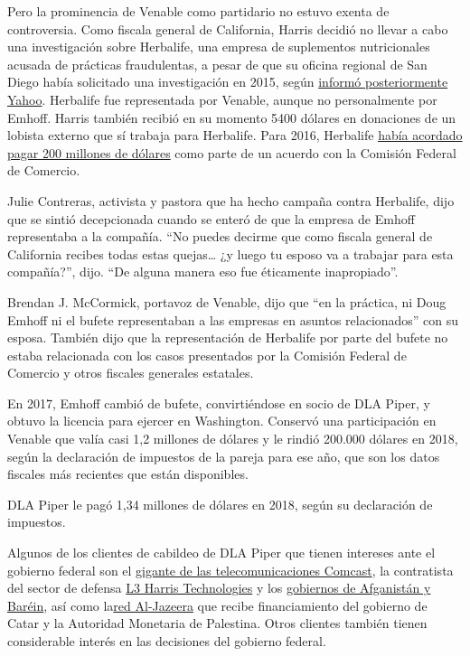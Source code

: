 Pero la prominencia de Venable como partidario no estuvo exenta de
controversia. Como fiscala general de California, Harris decidió no
llevar a cabo una investigación sobre Herbalife, una empresa de
suplementos nutricionales acusada de prácticas fraudulentas, a pesar de
que su oficina regional de San Diego había solicitado una investigación
en 2015, según
\href{https://news.yahoo.com/kamala-harris-herbalife-accused-of-exploiting-latinos-090000896.html}{informó
posteriormente Yahoo}. Herbalife fue representada por Venable, aunque no
personalmente por Emhoff. Harris también recibió en su momento 5400
dólares en donaciones de un lobista externo que sí trabaja para
Herbalife. Para 2016, Herbalife
\href{https://www.ftc.gov/news-events/press-releases/2016/07/herbalife-will-restructure-its-multi-level-marketing-operations}{había
acordado pagar 200 millones de dólares} como parte de un acuerdo con la
Comisión Federal de Comercio.

Julie Contreras, activista y pastora que ha hecho campaña contra
Herbalife, dijo que se sintió decepcionada cuando se enteró de que la
empresa de Emhoff representaba a la compañía. ``No puedes decirme que
como fiscala general de California recibes todas estas quejas\ldots{} ¿y
luego tu esposo va a trabajar para esta compañía?'', dijo. ``De alguna
manera eso fue éticamente inapropiado''.

Brendan J. McCormick, portavoz de Venable, dijo que ``en la práctica, ni
Doug Emhoff ni el bufete representaban a las empresas en asuntos
relacionados'' con su esposa. También dijo que la representación de
Herbalife por parte del bufete no estaba relacionada con los casos
presentados por la Comisión Federal de Comercio y otros fiscales
generales estatales.

En 2017, Emhoff cambió de bufete, convirtiéndose en socio de DLA Piper,
y obtuvo la licencia para ejercer en Washington. Conservó una
participación en Venable que valía casi 1,2 millones de dólares y le
rindió 200.000 dólares en 2018, según la declaración de impuestos de la
pareja para ese año, que son los datos fiscales más recientes que están
disponibles.

DLA Piper le pagó 1,34 millones de dólares en 2018, según su declaración
de impuestos.

Algunos de los clientes de cabildeo de DLA Piper que tienen intereses
ante el gobierno federal son el
\href{https://soprweb.senate.gov/index.cfm?event=getFilingDetails\&filingID=39114A4F-B235-46FD-9723-BB895DC5EE33\&filingTypeID=60}{gigante
de las telecomunicaciones Comcast}, la contratista del sector de defensa
\href{https://soprweb.senate.gov/index.cfm?event=getFilingDetails\&filingID=2FAE6D7A-F2A7-4DC5-9279-DADC7592DB7B\&filingTypeID=60}{L3
Harris Technologies} y los
\href{https://efile.fara.gov/docs/3712-Supplemental-Statement-20200330-32.pdf}{gobiernos
de Afganistán y Baréin}, así como
la\href{https://soprweb.senate.gov/index.cfm?event=getFilingDetails\&filingID=3245B45B-33E4-4D02-9964-DFFE7F5AA839\&filingTypeID=60}{red
Al-Jazeera} que recibe financiamiento del gobierno de Catar y la
Autoridad Monetaria de Palestina. Otros clientes también tienen
considerable interés en las decisiones del gobierno federal.

